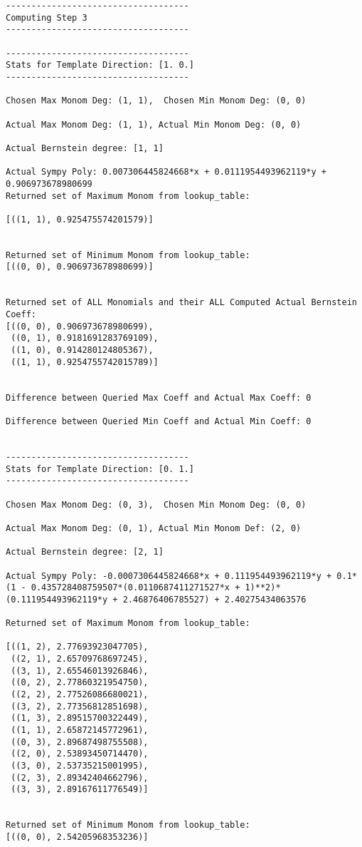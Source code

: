 \begin{verbatim}
------------------------------------
Computing Step 3
------------------------------------

------------------------------------
Stats for Template Direction: [1. 0.]
------------------------------------

Chosen Max Monom Deg: (1, 1),  Chosen Min Monom Deg: (0, 0)

Actual Max Monom Deg: (1, 1), Actual Min Monom Deg: (0, 0)

Actual Bernstein degree: [1, 1]

Actual Sympy Poly: 0.007306445824668*x + 0.0111954493962119*y + 0.906973678980699
Returned set of Maximum Monom from lookup_table:

[((1, 1), 0.925475574201579)]


Returned set of Minimum Monom from lookup_table:
[((0, 0), 0.906973678980699)]


Returned set of ALL Monomials and their ALL Computed Actual Bernstein Coeff:
[((0, 0), 0.906973678980699),
 ((0, 1), 0.9181691283769109),
 ((1, 0), 0.914280124805367),
 ((1, 1), 0.9254755742015789)]


Difference between Queried Max Coeff and Actual Max Coeff: 0

Difference between Queried Min Coeff and Actual Min Coeff: 0


------------------------------------
Stats for Template Direction: [0. 1.]
------------------------------------

Chosen Max Monom Deg: (0, 3),  Chosen Min Monom Deg: (0, 0)

Actual Max Monom Deg: (0, 1), Actual Min Monom Def: (2, 0)

Actual Bernstein degree: [2, 1]

Actual Sympy Poly: -0.0007306445824668*x + 0.111954493962119*y + 0.1*(1 - 0.435728408759507*(0.0110687411271527*x + 1)**2)*(0.111954493962119*y + 2.46876406785527) + 2.40275434063576

Returned set of Maximum Monom from lookup_table:

[((1, 2), 2.77693923047705),
 ((2, 1), 2.65709768697245),
 ((3, 1), 2.65546013926846),
 ((0, 2), 2.77860321954750),
 ((2, 2), 2.77526086680021),
 ((3, 2), 2.77356812851698),
 ((1, 3), 2.89515700322449),
 ((1, 1), 2.65872145772961),
 ((0, 3), 2.89687498755508),
 ((2, 0), 2.53893450714470),
 ((3, 0), 2.53735215001995),
 ((2, 3), 2.89342404662796),
 ((3, 3), 2.89167611776549)]


Returned set of Minimum Monom from lookup_table:
[((0, 0), 2.54205968353236)]



\end{verbatim}
